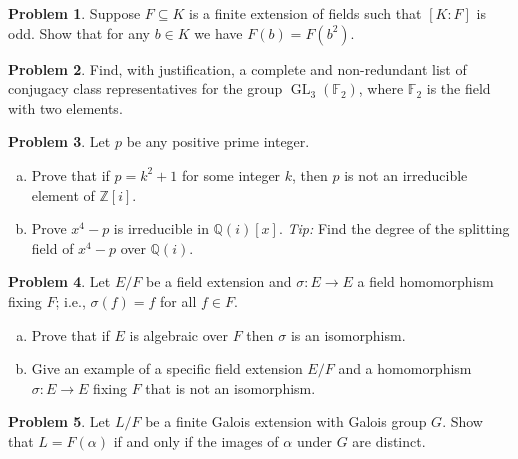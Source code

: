 \documentclass[11pt]{article}
\DeclareMathOperator{\GL}{GL}
\newcommand{\Q}{\mathbb{Q}}
\newcommand{\Z}{\mathbb{Z}}
\theoremstyle{definition}
\newtheorem{problem}{Problem}
\begin{document}
       
       \begin{problem} Suppose $F \subseteq K$ is a finite extension of fields such that $[K: F]$ is odd. Show that for any $b \in K$ we have $F(b) = F(b^2)$.
\end{problem}


\begin{problem} Find, with justification, a complete and non-redundant list of conjugacy class representatives for the group $\GL_3(\mathbb{F}_2)$, where $\mathbb{F}_2$ is the field with two elements.
\end{problem}

\begin{problem}
  Let $p$ be any positive prime integer.
  \begin{enumerate}[(a)]
  \item Prove that if $p = k^2 + 1$ for some integer $k$, then $p$ is not an irreducible element of $\Z[i]$.
  
\item Prove $x^4 - p$ is irreducible in $\Q(i)[x]$. {\em Tip:} Find the degree of the splitting field of $x^4 - p$ over $\Q(i)$.  
\end{enumerate}
\end{problem}

\begin{problem} Let $E/F$ be a field extension and $\sigma:E\to E$ a field homomorphism fixing $F$; i.e., $\sigma(f)=f$ for all $f\in F$.
\begin{enumerate}[(a)]
\item Prove that if $E$ is algebraic over $F$ then $\sigma$ is an isomorphism.
\item Give an example of a specific field extension $E/F$ and a homomorphism $\sigma:E\to E$ fixing $F$ that is not an isomorphism.
\end{enumerate}
\end{problem}

\begin{problem} Let $L/F$ be a finite Galois extension with Galois group $G$. Show that $L=F(\alpha)$ if and only if the images of $\alpha$ under $G$ are distinct.
\end{problem}
\end{document}
